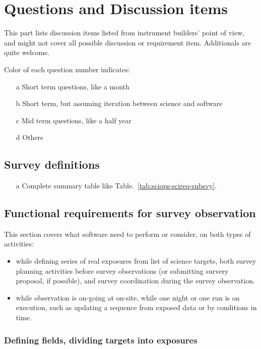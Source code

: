 \documentclass[a4paper,notitlepage]{article}
\newcommand{\cols}[1]{\textcolor{ccols}{#1}}
\newcommand{\colm}[1]{\textcolor{ccolm}{#1}}
\newcommand{\coll}[1]{\textcolor{ccoll}{#1}}
\begin{document}
\section{Questions and Discussion items}

This part lists discussion items listed from instrument builders' point 
of view, and might not cover all possible discussion or requirement item. 
Additionals are quite welcome. 

Color of each question number indicates: 
\begin{enumerate}
  \item[\cols{a}] Short term questions, like a month
  \item[\colm{b}] Short term, but assuming iteration between science and software
  \item[\coll{c}] Mid term questions, like a half year
  \item[d] Others
\end{enumerate}

\subsection{Survey definitions}

\begin{enumerate}
  \item[\colm{a}] Complete summary table like Table.~\ref{tab:sciops-scireq-subsvy}.
\end{enumerate}

\subsection{Functional requirements for survey observation}

This section covers what software need to perform or consider, 
on both types of activities: 
\begin{itemize}
  \item while defining series of real exposures from list of science targets, 
    both survey planning activities before survey observations (or submitting 
    survery proposal, if possible), and survey coordination during the survey 
    observation. 
  \item while observation is on-going at on-site, while one night or one run 
    is on execution, such as updating a sequence from exposed data or by 
    conditions in time. 
\end{itemize}

\subsubsection{Defining fields, dividing targets into exposures}
\end{document}

